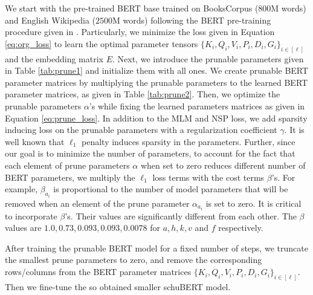 \documentclass[11pt,a4paper]{article}
\begin{document}
We start with the pre-trained BERT base trained on BooksCorpus ($800$M words) and English Wikipedia ($2500$M words) following the BERT pre-training procedure given in \citet{devlin2018bert}. 
Particularly, we minimize the loss given in Equation \eqref{eq:org_loss} to learn the optimal parameter tensors $\{K_i, Q_i, V_i, P_i, D_i, G_i\}_{i \in [\ell]}$ and the embedding matrix $E$. Next, we introduce the prunable parameters given in Table \ref{tab:prune1} and initialize them with all ones. We create prunable BERT parameter matrices by multiplying the prunable parameters to the learned BERT parameter matrices, as given in Table \ref{tab:prune2}. Then, we optimize the prunable parameters $\alpha$'s while fixing the learned parameters matrices as given in Equation \ref{eq:prune_loss}. In addition to the MLM and NSP loss, we add sparsity inducing loss on the prunable parameters with a regularization coefficient $\gamma$. It is well known that $\ell_1$ penalty induces sparsity in the parameters. Further, since our goal is to minimize the number of parameters, to account for the fact that each element of prune parameters $\alpha$ when set to zero reduces different number of BERT parameters, we multiply the $\ell_1$ loss terms with the cost terms $\beta$'s. For example, $\beta_{a_i}$ is proportional to the number of model parameters that will be removed when an element of the prune parameter $\alpha_{a_i}$ is set to zero. It is critical to incorporate $\beta$'s. Their values are significantly different from each other. The $\beta$ values are $1.0, 0.73, 0.093, 0.093, 0.0078$ for $a,h,k,v$ and $f$ respectively. 

After training the prunable BERT model for a fixed number of steps, we truncate the smallest prune parameters to zero, and remove the corresponding rows/columns from the BERT parameter matrices $\{K_i, Q_i, V_i, P_i, D_i, G_i\}_{i \in [\ell]}$. Then we fine-tune the so obtained smaller schuBERT model. 
\end{document}
